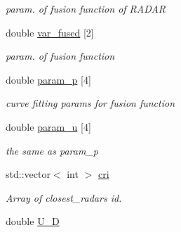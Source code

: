 \begin{DoxyCompactItemize}
\begin{DoxyCompactList}\small\item\em param. of fusion function of R\+A\+D\+A\+R \end{DoxyCompactList}\item 
\hypertarget{class_sensor_info_aa9131e08fa3152702d373e225cadea0c}{}double \hyperlink{class_sensor_info_aa9131e08fa3152702d373e225cadea0c}{var\+\_\+fused} \mbox{[}2\mbox{]}\label{class_sensor_info_aa9131e08fa3152702d373e225cadea0c}

\begin{DoxyCompactList}\small\item\em param. of fusion function \end{DoxyCompactList}\item 
\hypertarget{class_sensor_info_a7481e34fff1d337962ed74e8251db482}{}double \hyperlink{class_sensor_info_a7481e34fff1d337962ed74e8251db482}{param\+\_\+p} \mbox{[}4\mbox{]}\label{class_sensor_info_a7481e34fff1d337962ed74e8251db482}

\begin{DoxyCompactList}\small\item\em curve fitting params for fusion function \end{DoxyCompactList}\item 
\hypertarget{class_sensor_info_ac301f69f003ea6c32bf16166be172d8d}{}double \hyperlink{class_sensor_info_ac301f69f003ea6c32bf16166be172d8d}{param\+\_\+u} \mbox{[}4\mbox{]}\label{class_sensor_info_ac301f69f003ea6c32bf16166be172d8d}

\begin{DoxyCompactList}\small\item\em the same as {\ttfamily param\+\_\+p} \end{DoxyCompactList}\item 
\hypertarget{class_sensor_info_a0898d5a31aea436fc9590ef871d35dbc}{}std\+::vector$<$ int $>$ \hyperlink{class_sensor_info_a0898d5a31aea436fc9590ef871d35dbc}{cri}\label{class_sensor_info_a0898d5a31aea436fc9590ef871d35dbc}

\begin{DoxyCompactList}\small\item\em Array of closest\+\_\+radar\textquotesingle{}s id. \end{DoxyCompactList}\item 
\hypertarget{class_sensor_info_a5270ab176bd0c0b33042650729108d2a}{}double \hyperlink{class_sensor_info_a5270ab176bd0c0b33042650729108d2a}{U\+\_\+\+D}\label{class_sensor_info_a5270ab176bd0c0b33042650729108d2a}


\end{DoxyCompactItemize}
